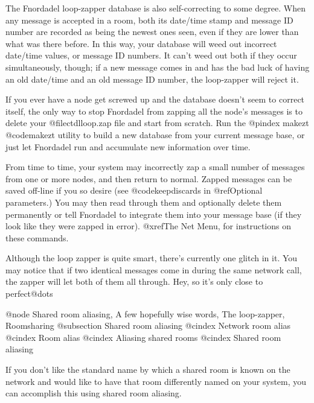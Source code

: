 The Fnordadel loop-zapper database is also self-correcting
to some degree.  When any message is accepted in a room, both its
date/time stamp and message ID number are recorded as being the newest ones
seen, even if they are lower than what was there before.  In this way,
your database will weed out incorrect date/time values, or message ID numbers.
It can't weed out both if they occur simultaneously, though; if a new
message comes in and has the bad luck of having an old date/time and
an old message ID number, the loop-zapper will reject it.

If you ever have
a node get screwed up and the database doesn't seem to correct itself,
the only way to stop Fnordadel from zapping all the node's messages
is to delete your @file{ctdlloop.zap} file and start from scratch.  Run the
@pindex makezt
@code{makezt} utility to build a new database from your current message
base, or just let Fnordadel run and accumulate new information over
time.

From time to time, your system may incorrectly zap a small
number of messages from one or more nodes, and then return to normal.
Zapped messages can be saved off-line if you so desire
(see @code{keepdiscards} in @ref{Optional parameters}.)
You may then read through them and optionally delete them
permanently or tell Fnordadel to integrate them into your message
base (if they look like they were zapped in error).  @xref{The Net Menu},
for instructions on these commands.

Although the loop zapper is quite smart, there's currently one glitch in it.
You may notice that if two identical messages come in during the same network
call, the zapper will let both of them all through.  Hey, so it's only close
to perfect@dots{}

@node Shared room aliasing, A few hopefully wise words, The loop-zapper, Roomsharing
@subsection Shared room aliasing
@cindex Network room alias
@cindex Room alias
@cindex Aliasing shared rooms
@cindex Shared room aliasing

If you don't like the standard name by which a shared
room is known on the network and would like to have that room
differently named on your system, you can accomplish this using
shared room aliasing.

